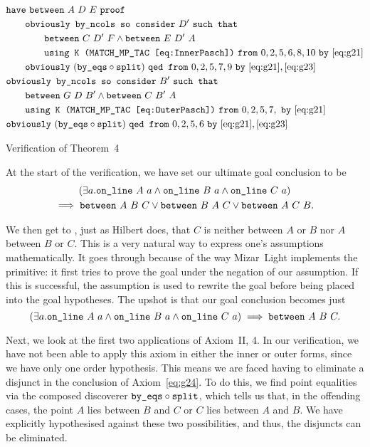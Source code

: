 \begin{boxedfigure}
\begin{align*}
&\code{have}\ \between{A}{D}{E}\ \code{proof}\\
&\qquad\code{obviously by\_ncols so consider}\ D'\ \code{such that}\\
&\qquad\qquad\between{C}{D'}{F}\wedge\between{E}{D'}{A}\\
&\qquad\qquad\code{using K (MATCH\_MP\_TAC \eqref{eq:InnerPasch})}\ \code{from}\ 0,2,5,6,8,10\ \code{by}\ \eqref{eq:g21}\\
&\qquad\code{obviously}\ (\code{by\_eqs}\circ\code{split})\ \code{qed from}\ 0,2,5,7,9\ \code{by}\ \eqref{eq:g21},\eqref{eq:g23}\\
&\code{obviously by\_ncols so consider}\ B'\ \code{such that}\\
&\qquad\between{G}{D}{B'}\wedge\between{C}{B'}{A}\\
&\qquad\code{using K (MATCH\_MP\_TAC \eqref{eq:OuterPasch})}\ \code{from}\ 0,2,5,7,\ \code{by}\ \eqref{eq:g21}\\
&\code{obviously}\ (\code{by\_eqs}\circ\code{split})\ \code{qed from}\ 0,2,5,6\ \code{by}\ \eqref{eq:g21},\eqref{eq:g23}\\
\end{align*}
\caption{Verification of Theorem~4}
\label{fig:FourVerification}
\end{boxedfigure}

At the start of the verification, we have set our ultimate goal conclusion to be
\begin{multline*}
(\exists a. \code{on\_line}\ A\ a\wedge\code{on\_line}\ B\ a\wedge\code{on\_line}\ C\ a) \\\implies\between{A}{B}{C}\vee\between{B}{A}{C}\vee\between{A}{C}{B}.
\end{multline*}

We then get to , just as Hilbert does, that $C$ is neither between $A$ or $B$ nor $A$ between $B$ or $C$. This is a very natural way to express one's assumptions mathematically. It goes through because of the way Mizar~Light implements the  primitive: it first tries to prove the goal under the negation of our assumption. If this is successful, the assumption is used to rewrite the goal before being placed into the goal hypotheses. The upshot is that our goal conclusion becomes just
\begin{displaymath}
(\exists a. \code{on\_line}\ A\ a\wedge\code{on\_line}\ B\ a\wedge\code{on\_line}\ C\ a) \implies\between{A}{B}{C}.
\end{displaymath}

Next, we look at the first two applications of Axiom~II, 4. In our verification, we have not been able to apply this axiom in either the inner or outer forms, since we have only one order hypothesis. This means we are faced having to eliminate a disjunct in the conclusion of Axiom~\ref{eq:g24}. To do this, we find point equalities via the composed discoverer $\texttt{by\_eqs}\circ\texttt{split}$, which tells us that, in the offending cases, the point $A$ lies between $B$ and $C$ or $C$ lies between $A$ and $B$. We have explicitly hypothesised against these two possibilities, and thus, the disjuncts can be eliminated.

